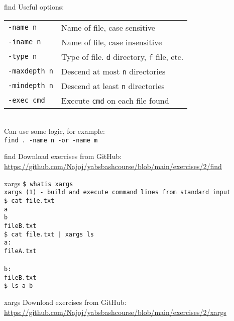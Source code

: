 \documentclass{beamer}
\let\tt\texttt
\begin{document}
\begin{frame}{find}
        Useful options:\\
        \begin{tabular}{| l | l}
                \hline
                \tt{-name n}     &   Name of file, case sensitive \\
                \tt{-iname n}    &   Name of file, case insensitive \\
                \tt{-type n}     &   Type of file. \tt{d} directory, \tt{f} file, etc. \\
                \tt{-maxdepth n} &   Descend at most \tt{n} directories \\
                \tt{-mindepth n} &   Descend at least \tt{n} directories \\
                \tt{-exec cmd }  &   Execute \tt{cmd} on each file found \\
                \hline
        \end{tabular} \\
        \medskip
        Can use some logic, for example: \\
        \tt{find . -name n -or -name m}
\end{frame}

\begin{frame}{find}
        Download exercises from GitHub: \\
        \url{https://github.com/Najoj/yabsbashcourse/blob/main/exercises/2/find}
\end{frame}

\begin{frame}{xargs}
        \tt{\$ whatis xargs}\\
        \tt{xargs (1)  - build and execute command lines from standard input}\\
        \tt{\$ cat file.txt} \\
        \tt{a} \\
        \tt{b} \\
        \tt{fileB.txt} \\
        \tt{\$ cat file.txt | xargs ls} \\
        \tt{a:} \\
        \tt{fileA.txt} \\
        \tt{} \\
        \tt{b:} \\
        \tt{fileB.txt} \\
        \tt{\$ ls a b} \\
\end{frame}

\begin{frame}{xargs}
        Download exercises from GitHub: \\
        \url{https://github.com/Najoj/yabsbashcourse/blob/main/exercises/2/xargs}
\end{frame}
\end{document}
